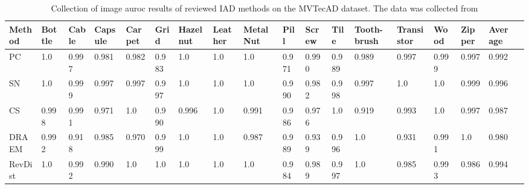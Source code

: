 \begin{table}[htbp]
    \tiny
    \centering
    \begin{tabularx}{\textwidth}{|X|X|X|X|X|X|X|X|X|X|X|X|X|X|X|X|X|X|}%
        \hline
        \textbf{Method} & \textbf{Bottle} & \textbf{Cable} & \textbf{Capsule} & \textbf{Carpet} & \textbf{Grid} & \textbf{Hazelnut} & \textbf{Leather} & \textbf{Metal Nut} & \textbf{Pill} & \textbf{Screw} & \textbf{Tile} & \textbf{Tooth-brush} & \textbf{Transistor} & \textbf{Wood} & \textbf{Zipper} & \textbf{Average} \\
        \hline
        PC \cite{patchCore2022} & 1.0 & 0.997 & 0.981 & 0.982 & 0.983 & 1.0 & 1.0 & 1.0 & 0.971 & 0.990 & 0.989 & 0.989 & 0.997 & 0.999 & 0.997 & 0.992 \\
        \hline
        SN \cite{liu2023simplenet} & 1.0 & 0.999 & 0.997 & 0.997 & 0.997 & 1.0 & 1.0 & 1.0 & 0.990 & 0.982 & 0.998 & 0.997 & 1.0 & 1.0 & 0.999 & 0.996 \\
        \hline
        CS \cite{csflow2022} & 0.998 & 0.991 & 0.971 & 1.0 & 0.990 & 0.996 & 1.0 & 0.991 & 0.986 & 0.976 & 1.0 & 0.919 & 0.993 & 1.0 & 0.997 & 0.987 \\
        \hline
        DRAEM \cite{Zavrtanik_2021DRAEM} & 0.992 & 0.918 & 0.985 & 0.970 & 0.999 & 1.0 & 1.0 & 0.987 & 0.989 & 0.939 & 0.996 & 1.0 & 0.931 & 0.991 & 1.0 & 0.980 \\
        \hline
        RevDist \cite{revdist2023} & 1.0 & 0.992 & 0.990 & 1.0 & 1.0 & 1.0 & 1.0 & 1.0 & 0.984 & 0.989 & 0.997 & 1.0 & 0.985 & 0.993 & 0.986 & 0.994 \\
        \hline
    \end{tabularx}
    \caption{Collection of image auroc results of reviewed IAD methods on the MVTecAD \cite{MVTEC_Bergmann_2021} dataset. The data was collected from \cite{liu2024deep} \cite{liu2023simplenet} \cite{csflow2022} \cite{Zavrtanik_2021DRAEM} \cite{revdist2023}}
    \label{tab:imageaurocmvtec}
\end{table}

